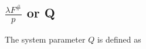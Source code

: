 \documentclass[10pt,journal]{IEEEtran}  %
\begin{document}

\subsection{$\frac{\lambda F^\#}{p}$ or Q}
\label{sec:q}

The system parameter $Q$ is defined as \cite{fiete_q}
\end{document}

